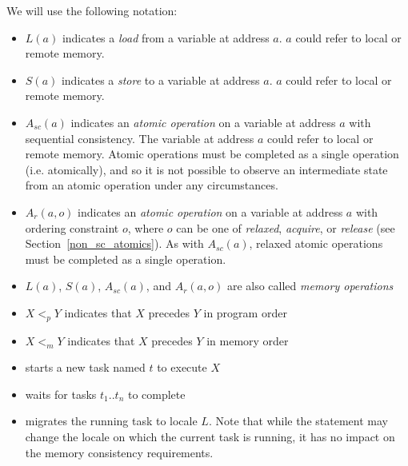We will use the following notation:
\begin{itemize}

  \item $L(a)$ indicates a \textit{load} from a variable at address $a$.
  $a$ could refer to local or remote memory.

  \item $S(a)$ indicates a \textit{store} to a variable at address $a$.
  $a$ could refer to local or remote memory.

  \item $A_{sc}(a)$ indicates an \textit{atomic operation} on a variable
  at address $a$ with sequential consistency. The variable at address
  $a$ could refer to local or remote memory.  Atomic operations must
  be completed as a single operation (i.e. atomically), and so it is
  not possible to observe an intermediate state from an atomic
  operation under any circumstances.

  \item $A_r(a,o)$ indicates an \textit{atomic operation} on a
  variable at address $a$ with ordering constraint $o$, where $o$ can
  be one of \emph{relaxed}, \emph{acquire}, or \emph{release} (see
  Section~\ref{non_sc_atomics}).  As with $A_{sc}(a)$, relaxed atomic
  operations must be completed as a single operation.

  \item $L(a)$, $S(a)$, $A_{sc}(a)$, and $A_r(a,o)$ are also called
  \textit{memory operations}

  \item $X <_p Y$ indicates that $X$ precedes $Y$ in program order

  \item $X <_m Y$ indicates that $X$ precedes $Y$ in memory order

  \item {} starts a new task named $t$ to execute $X$

  \item {} waits for tasks $t_1..t_n$ to complete

  \item {} migrates the running task to locale $L$. Note
that while the  statement may change the locale on which the
current task is running, it has no impact on the memory consistency
requirements.

\end{itemize}

